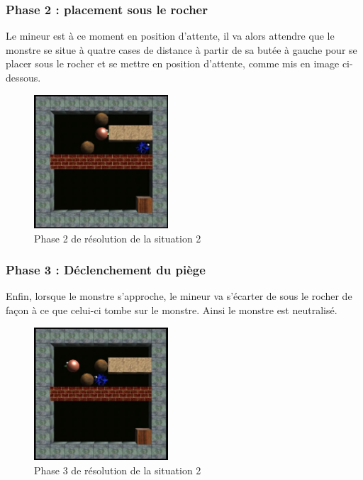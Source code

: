 \documentclass[a4paper,11pt]{article}
\begin{document}
	 \newpage
	\subsubsection{Phase 2 : placement sous le rocher}
	
Le mineur est à ce moment en position d’attente, il va alors attendre que le monstre se situe à quatre cases de distance à partir de sa butée à gauche pour se placer sous le rocher et se mettre en position d’attente, comme mis en image ci-dessous.

	\begin{figure}[h]
			\center
			\includegraphics[width=5cm]{situation2-3}
			\caption{\label{situation22} Phase 2 de résolution de la situation 2 }
		\end{figure}
		
	\subsubsection{Phase 3 : Déclenchement du piège}
	
Enfin, lorsque le monstre s’approche, le mineur va s’écarter de sous le rocher de façon à ce que celui-ci tombe sur le monstre. Ainsi le monstre est neutralisé.

		\begin{figure}[h]
			\center
			\includegraphics[width=5cm]{situation2-4}
			\caption{\label{situation22} Phase 3 de résolution de la situation 2 }
		\end{figure}
		
	\newpage
\end{document}
